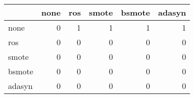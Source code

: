 \begin{tabular}{lrrrrr}
\hline
        &   none &   ros &   smote &   bsmote &   adasyn \\
\hline
 none   &      0 &     1 &       1 &        1 &        1 \\
 ros    &      0 &     0 &       0 &        0 &        0 \\
 smote  &      0 &     0 &       0 &        0 &        0 \\
 bsmote &      0 &     0 &       0 &        0 &        0 \\
 adasyn &      0 &     0 &       0 &        0 &        0 \\
\hline
\end{tabular}